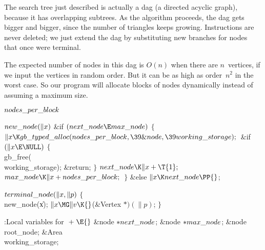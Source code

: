 The search tree just described is actually a dag (a directed acyclic
graph), because it has overlapping subtrees. As the algorithm proceeds,
the dag gets bigger and bigger, since the number of triangles keeps
growing. Instructions are never deleted; we just extend the dag by
substituting new branches for nodes that once were terminal.

The expected number of nodes in this dag is $O(n)$ when there are $n$~vertices,
if we input the vertices in random order. But it can be as high as order~$n^2$
in the worst case. So our program will allocate blocks of nodes dynamically
instead of assuming a maximum size.

\Y\B\4\D$\\{nodes\_per\_block}$ \5
\par
\B\4\D$\\{new\_node}(\|x)$ \6
\&{if} ${}(\\{next\_node}\E\\{max\_node}){}$\5
${}\{{}$\1\6
${}\|x\K\\{gb\_typed\_alloc}(\\{nodes\_per\_block},\39\&{node},\39\\{working%
\_storage});{}$\6
\&{if} ${}(\|x\E\NULL){}$\5
${}\{{}$\1\6
\\{gb\_free}(\\{working\_storage});\6
\&{return};\6
\4${}\}{}$\2\6
${}\\{next\_node}\K\|x+\T{1};{}$\6
${}\\{max\_node}\K\|x+\\{nodes\_per\_block};{}$\6
\4${}\}{}$\5
\2\&{else}\1\5
${}\|x\K\\{next\_node}\PP{}$;\2\Y\par
\B\4\D$\\{terminal\_node}(\|x,\|p)$ \6
${}\{{}$\5
\1\\{new\_node}(\|x);\6
${}\|x\MG\|v\K{}$(\&{Vertex} ${}{*})(\|p){}$;\6
\4${}\}{}$%
\2\par
\Y\B\4:Local variables for \X${}\mathrel+\E{}$\6
\&{node} ${}{*}\\{next\_node}{}$;\6
\&{node} ${}{*}\\{max\_node}{}$;\6
\&{node} \\{root\_node};\6
\&{Area} \\{working\_storage};\par
\fi

